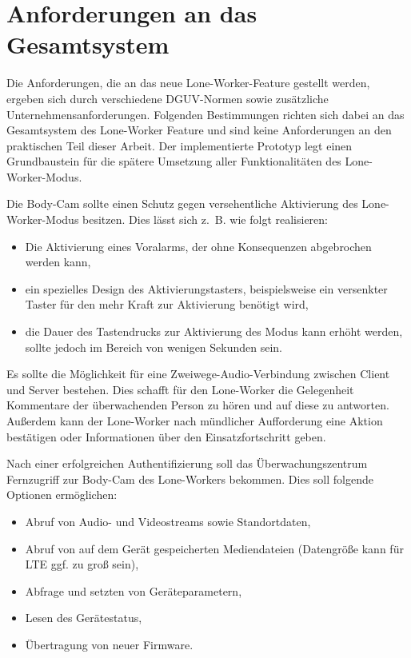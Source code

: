 \documentclass[thesis.tex]{subfiles}
\begin{document}
\section{Anforderungen an das Gesamtsystem}\label{chap:anforderungen}
Die Anforderungen, die an das neue Lone-Worker-Feature gestellt werden, ergeben sich durch verschiedene DGUV-Normen sowie zusätzliche Unternehmensanforderungen.
Folgenden Bestimmungen richten sich dabei an das Gesamtsystem des Lone-Worker Feature und sind keine Anforderungen an den praktischen Teil dieser Arbeit.
Der implementierte Prototyp legt einen Grundbaustein für die spätere Umsetzung aller Funktionalitäten des Lone-Worker-Modus.

Die Body-Cam sollte einen Schutz gegen versehentliche Aktivierung des Lone-Worker-Modus besitzen.
Dies lässt sich z.~B. wie folgt realisieren:
\begin{itemize}
    \item Die Aktivierung eines Voralarms, der ohne Konsequenzen abgebrochen werden kann,
    \item ein spezielles Design des Aktivierungstasters, beispielsweise ein versenkter Taster für den mehr Kraft zur Aktivierung benötigt wird,
    \item die Dauer des Tastendrucks zur Aktivierung des Modus kann erhöht werden, sollte jedoch im Bereich von wenigen Sekunden sein.
\end{itemize}

Es sollte die Möglichkeit für eine Zweiwege-Audio-Verbindung zwischen Client und Server bestehen.
Dies schafft für den Lone-Worker die Gelegenheit Kommentare der überwachenden Person zu hören und auf diese zu antworten.
Außerdem kann der Lone-Worker nach mündlicher Aufforderung eine Aktion bestätigen oder Informationen über den Einsatzfortschritt geben.

Nach einer erfolgreichen Authentifizierung soll das Überwachungszentrum Fernzugriff zur Body-Cam des Lone-Workers bekommen.
Dies soll folgende Optionen ermöglichen:
\begin{itemize}
    \item Abruf von Audio- und Videostreams sowie Standortdaten,
    \item Abruf von auf dem Gerät gespeicherten Mediendateien (Datengröße kann für LTE ggf. zu groß sein),
    \item Abfrage und setzten von Geräteparametern,
    \item Lesen des Gerätestatus,
    \item Übertragung von neuer Firmware.
\end{itemize}
\end{document}
